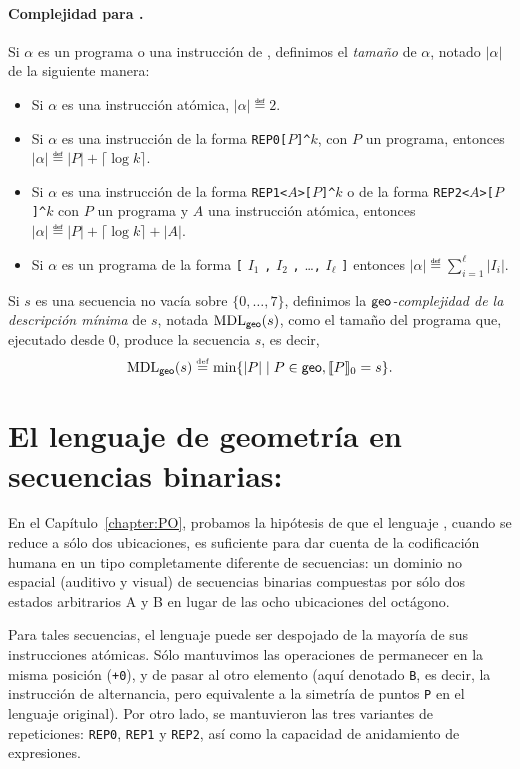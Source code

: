\paragraph{Complejidad para \gramgeo.} 
Si $\alpha$ es un programa o una instrucción de \gramgeo, definimos el {\em tamaño} de $\alpha$, notado $|\alpha|$ de la siguiente manera:
%
\begin{itemize}
\item Si $\alpha$ es una instrucción atómica, $|\alpha|\eqdef 2$.

\item Si $\alpha$ es una instrucción de la forma 
\verb#REP0[#$P$\verb#]^#$k$, con $P$ un programa, 
entonces $|\alpha|\eqdef |P|+\lceil \log k\rceil$.

\item Si $\alpha$ es una instrucción de la forma 
\verb#REP1<#$A$\verb#>[#$P$\verb#]^#$k$ o de la forma 
\verb#REP2<#$A$\verb#>[#$P$\verb#]^#$k$ 
con $P$ un programa y $A$ una instrucción atómica, 
entonces $|\alpha|\eqdef |P|+\lceil \log k\rceil+|A|$.

\item Si $\alpha$ es un programa de la forma
\verb#[# $I_1$ \verb#,# $I_2$ \verb#,# \dots \verb#,# $I_\ell$ \verb#]#
entonces $|\alpha|\eqdef \sum_{i=1}^\ell|I_i|$.
\end{itemize}
%
Si $s$ es una secuencia no vacía sobre $\{0,\dots,7\}$, definimos la {\em ${\sf geo}$-complejidad de la descripción mínima} de $s$, notada ${\rm MDL}_{{\sf geo}}(s)$, como el tamaño del programa que, ejecutado desde 0, produce la secuencia $s$, es decir,
$$
{\rm MDL}_{{\sf geo}}(s)\stackrel{\scriptscriptstyle \mathrm{def}}{=}\min\{|P|\mid P\in{\sf geo},\llbracket P\rrbracket_0=s\}.
$$


\section*{El lenguaje de geometría en secuencias binarias: \grambin}

En el Capítulo~\ref{chapter:PO}, probamos la hipótesis de que el lenguaje \gramgeo, cuando se reduce a sólo dos ubicaciones, es suficiente para dar cuenta de la codificación humana en un tipo completamente diferente de secuencias: un dominio no espacial (auditivo y visual) de secuencias binarias compuestas por sólo dos estados arbitrarios A y B en lugar de las ocho ubicaciones del octágono. 

Para tales secuencias, el lenguaje puede ser despojado de la mayoría de sus instrucciones atómicas. Sólo mantuvimos las operaciones de permanecer en la misma posición (\verb#+0#), y de pasar al otro elemento (aquí denotado \verb#B#, es decir, la instrucción de alternancia, pero equivalente a la simetría de puntos \verb#P# en el lenguaje original). Por otro lado, se mantuvieron las tres variantes de repeticiones: \verb#REP0#, \verb#REP1# y \verb#REP2#, así como la capacidad de anidamiento de expresiones. 


